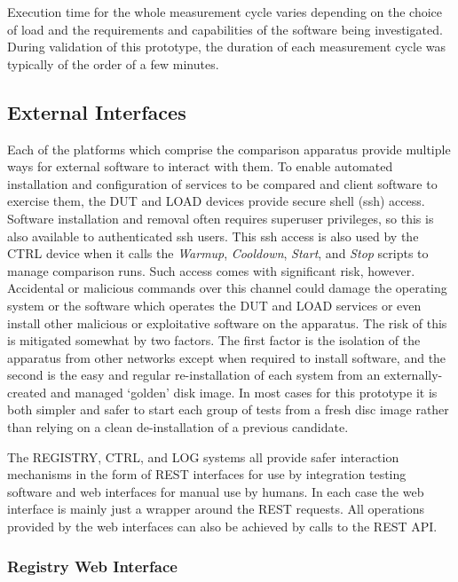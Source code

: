 Execution time for the whole measurement cycle varies depending on the choice of load and the requirements and capabilities of the software being investigated. During validation of this prototype, the duration of each measurement cycle was typically of the order of a few minutes.

\subsection{External Interfaces}
\label{Web UI}

Each of the platforms which comprise the comparison apparatus provide multiple ways for external software to interact with them. To enable automated installation and configuration of services to be compared and client software to exercise them, the DUT and LOAD devices provide secure shell (ssh) access. Software installation and removal often requires superuser privileges, so this is also available to authenticated ssh users. This ssh access is also used by the CTRL device when it calls the \emph{Warmup}, \emph{Cooldown}, \emph{Start}, and \emph{Stop} scripts to manage comparison runs. Such access comes with significant risk, however. Accidental or malicious commands over this channel could damage the operating system or the software which operates the DUT and LOAD services or even install other malicious or exploitative software on the apparatus. The risk of this is mitigated somewhat by two factors. The first factor is the isolation of the apparatus from other networks except when required to install software, and the second is the easy and regular re-installation of each system from an externally-created and managed `golden' disk image. In most cases for this prototype it is both simpler and safer to start each group of tests from a fresh disc image rather than relying on a clean de-installation of a previous candidate.

The REGISTRY, CTRL, and LOG systems all provide safer interaction mechanisms in the form of REST interfaces for use by integration testing software and web interfaces for manual use by humans. In each case the web interface is mainly just a wrapper around the REST requests. All operations provided by the web interfaces can also be achieved by calls to the REST API.

\subsubsection{Registry Web Interface}
\label{Web UI Registry}

